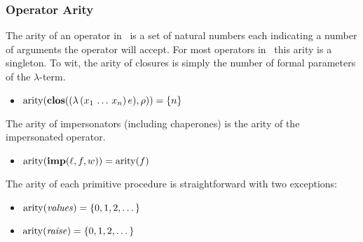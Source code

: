 \subsubsection{Operator Arity}

The arity of an operator in \chapcalc\ is a set of natural numbers each indicating a number of arguments the operator will accept.
For most operators in \chapcalc\, this arity is a singleton.
To wit, the arity of closures is simply the number of formal parameters of the $\lambda$-term.

\begin{itemize}
\item[] $\mathrm{arity}(\mathbf{clos}((\lambda\,(x_1\,\dots\,x_n)\,e),\rho))=\{n\}$
\end{itemize}

The arity of impersonators (including chaperones) is the arity of the impersonated operator.

\begin{itemize}
\item[] $\mathrm{arity}(\mathbf{imp}(\ell,f,w))=\mathrm{arity}(f)$
\end{itemize}

The arity of each primitive procedure is straightforward with two exceptions:

\begin{itemize}
\item[] $\mathrm{arity}(\mathit{values})=\{0,1,2,\dots\}$
\item[] $\mathrm{arity}(\mathit{raise})=\{0,1,2,\dots\}$
\end{itemize}


\newcommand{\funarr}[2]{$\mathbf{#1}\rightarrow\mathbf{#2}$}

